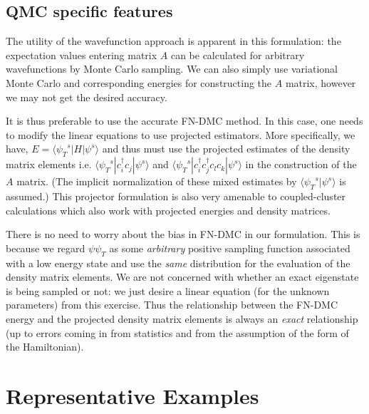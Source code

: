 \documentclass[prl,12pt,onecolumn,nofootinbib,notitlepage,english,superscriptaddress]{revtex4-1}
\newcommand{\HJC}[1]{{\color{RED}{\bf HJC: #1}}}
\begin{document}
\subsection{QMC specific features}
\HJC{Till this point perfectly general... QMC helps.... etc etc}
The utility of the wavefunction approach is apparent in this 
formulation: the expectation values entering matrix $A$ 
can be calculated for arbitrary wavefunctions by Monte Carlo sampling.
We can also simply use variational Monte Carlo and corresponding energies
for constructing the $A$ matrix, however we may not get the desired accuracy. 

\HJC{QMC specific}
It is thus preferable to use the accurate FN-DMC method. In this case, one needs to modify the linear equations 
to use projected estimators. More specifically, we have, $E= \langle {\psi_T}^{s}| H | {\psi}^s \rangle$ 
and thus must use the projected estimates of the density matrix elements i.e. 
$\langle {\psi_T}^s | c_i^{\dagger} c_j | {\psi}^s \rangle$ and $\langle {\psi_T}^s| c_i^{\dagger}c_j^{\dagger} c_l c_k | {\psi}^s \rangle$ 
in the construction of the $A$ matrix. (The implicit normalization of these 
mixed estimates by $\langle {\psi_T}^s | \psi^{s} \rangle$ is assumed.) 
This projector formulation is also very amenable to 
coupled-cluster calculations which also work with projected energies 
and density matrices.

\HJC{QMC specific}
There is no need to worry about the bias in FN-DMC in our formulation. 
This is because we regard $\psi \psi_T$ as some \emph{arbitrary} positive sampling function 
associated with a low energy state and use the \emph{same} distribution for the 
evaluation of the density matrix elements. We are not concerned with whether 
an exact eigenstate is being sampled or not: we just desire a linear equation 
(for the unknown parameters) from this exercise. Thus the relationship between the FN-DMC energy 
and the projected density matrix elements is always an \emph{exact} relationship 
(up to errors coming in from statistics and from the 
assumption of the form of the Hamiltonian). 



\section{Representative Examples}
\end{document}
